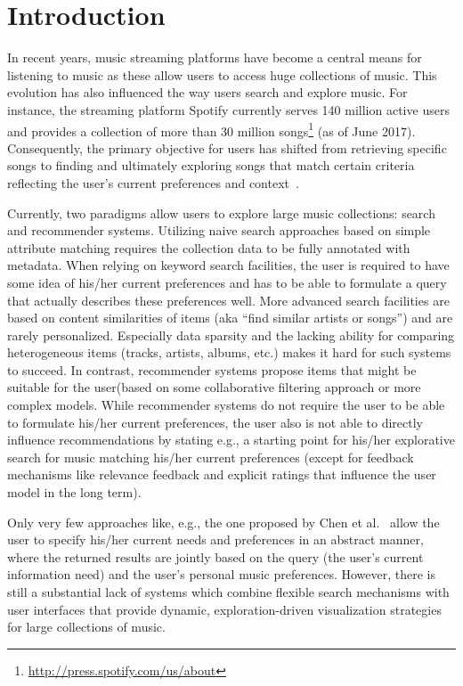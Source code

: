 \documentclass[sigconf]{acmart}
\begin{document}

\maketitle

\section{Introduction}
In recent years, music streaming platforms have become a central means for listening to music as these allow users to access huge collections of music. This evolution has also influenced the way users search and explore music. For instance, the streaming platform Spotify currently serves 140 million active users and provides a collection of more than 30 million songs\footnote{\url{http://press.spotify.com/us/about}} (as of June 2017). Consequently, the primary objective for users has shifted from retrieving specific songs to finding and ultimately exploring songs that match certain criteria reflecting the user's current preferences and context~\cite{lee2016look,kamalzadeh2012survey}. 

Currently, two paradigms allow users to explore large music collections: search and recommender systems. Utilizing naive search approaches based on simple attribute matching requires the collection data to be fully annotated with metadata. When relying on keyword search facilities, the user is required to have some idea of his/her current preferences and has to be able to formulate a query that actually describes these preferences well. More advanced search facilities are based on content similarities of items (aka ``find similar artists or songs'') and are rarely personalized. Especially data sparsity and the lacking ability for comparing heterogeneous items (tracks, artists, albums, etc.) makes it hard for such systems to succeed. In contrast, recommender systems propose items that might be suitable for the user(based on some collaborative filtering approach or more complex models. While recommender systems do not require the user to be able to formulate his/her current preferences, the user also is not able to directly influence recommendations by stating e.g., a starting point for his/her explorative search for music matching his/her current preferences (except for feedback mechanisms like relevance feedback and explicit ratings that influence the user model in the long term).

Only very few approaches like, e.g., the one proposed by Chen et al.~\cite{Chen:2016:QMR:2959100.2959169} allow the user to specify his/her current needs and preferences in an abstract manner, where the returned results are jointly based on the query (the user's current information need) and the user's personal music preferences. However, there is still a substantial lack of systems which combine flexible search mechanisms with user interfaces that provide dynamic, exploration-driven visualization strategies for large collections of music. 
\end{document}
